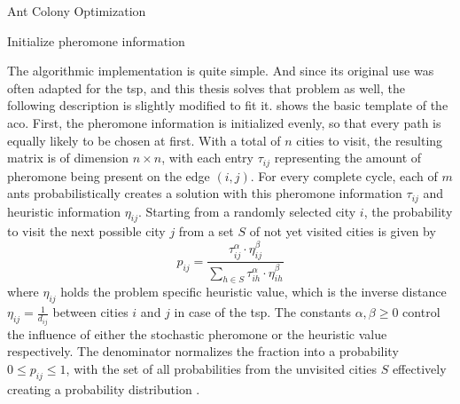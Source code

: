 \begin{algorithm}
	\caption{Ant Colony Optimization}
	\label{alg:aco}
	
	\begin{algorithmic}
		\State Initialize pheromone information
		\Repeat
		\State {}
		\EndFor
		\State {}
		\State {}
		\EndProcedure
	\end{algorithmic}
\end{algorithm}

The algorithmic implementation is quite simple. And since its original use was often adapted for the \gls{tsp}, and this thesis solves that problem as well, the following description is slightly modified to fit it.
 shows the basic template of the \gls{aco}. First, the pheromone information is initialized evenly, so that every path is equally likely to be chosen at first. With a total of $n$ cities to visit, the resulting matrix is of dimension $n \times n$, with each entry $\tau_{ij}$ representing the amount of pheromone being present on the edge $(i,j)$.
For every complete cycle, each of $m$ ants probabilistically creates a solution with this pheromone information $\tau_{ij}$ and heuristic information $\eta_{ij}$. Starting from a randomly selected city $i$, the probability to visit the next possible city $j$ from a set $S$ of not yet visited cities is given by 
\begin{equation}
		\label{eq:aco_prob}
		p_{ij} = \frac{\tau_{ij}^\alpha \cdot \eta_{ij}^\beta}{\sum_{h \in S} \tau_{ih}^\alpha \cdot \eta_{ih}^\beta}
\end{equation}
where $\eta_{ij}$ holds the problem specific heuristic value, which is the inverse distance $\eta_{ij} = \frac{1}{d_{ij}}$ between cities $i$ and $j$ in case of the \gls{tsp}. The constants $\alpha, \beta \geq 0$ control the influence of either the stochastic pheromone or the heuristic value respectively. The denominator normalizes the fraction into a probability $0 \leq p_{ij} \leq 1$, with the set of all probabilities from the unvisited cities $S$ effectively creating a probability distribution \cite{talbi2009metaheuristics}.

